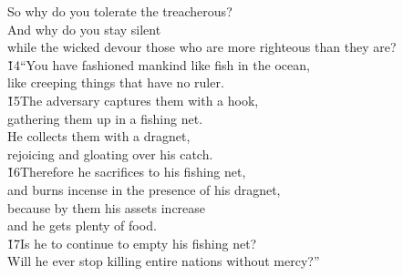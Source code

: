 \begin{poetry}
\poeml So why do you tolerate the treacherous? \\
\poemll    And why do you stay silent \\
\poemlll       while the wicked devour those who are more righteous than they are? \\
\poeml \v{14}``You have fashioned mankind like fish in the ocean, \\
\poemll    like creeping things that have no ruler. \\
\poeml \v{15}The adversary captures them with a hook, \\
\poemll    gathering them up in a fishing net. \\
\poeml He collects them with a dragnet, \\
\poemll    rejoicing and gloating over his catch. \\
\poeml \v{16}Therefore he sacrifices to his fishing net, \\
\poemll    and burns incense in the presence of his dragnet, \\
\poeml because by them his assets increase \\
\poemll    and he gets plenty of food. \\
\poeml \v{17}Is he to continue to empty his fishing net? \\
\poemll    Will he ever stop killing entire nations without mercy?''
\end{poetry}

